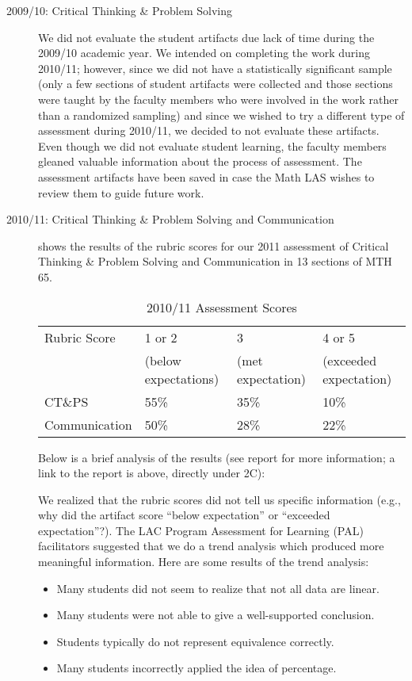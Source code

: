 \begin{description}
\item[2009/10: Critical Thinking \& Problem Solving]
We did not evaluate the student artifacts due lack of time during the 2009/10 academic year. We intended on completing the work during 2010/11; however, since we did not have a statistically significant sample (only a few sections of student artifacts were collected and those sections were taught by the faculty members who were involved in the work rather than a randomized sampling) and since we wished to try a different type of assessment during 2010/11, we decided to not evaluate these artifacts.  Even though we did not evaluate student learning, the faculty members gleaned valuable information about the process of assessment. The assessment artifacts have been saved in case the Math LAS wishes to review them to guide future work.
\item[2010/11:  Critical Thinking \& Problem Solving and Communication]
 shows the results of the rubric scores for our 2011 assessment of Critical Thinking \& Problem Solving and Communication in 13 sections of MTH 65.
\begin{table}[!htb]
\centering
\caption{2010/11 Assessment Scores}\label{ass:tab:201011scores}
\begin{tabular}{llll}
\toprule
Rubric Score & 1 or 2 & 3 & 4 or 5\\
&(below expectations)&(met expectation)&(exceeded expectation)\\
\midrule
CT\&PS &55\%&35\%&10\%\\
Communication &50\%&28\%&22\%\\
\bottomrule
\end{tabular}
\end{table}

Below is a brief analysis of the results (see report for more information; a link to the report is above, directly under 2C):

We realized that the rubric scores did not tell us specific information (e.g., why did the artifact score ``below expectation'' or ``exceeded expectation''?).  The LAC Program Assessment for Learning (PAL) facilitators suggested that we do a trend analysis which produced more meaningful information. Here are some results of the trend analysis:
\begin{itemize}
\item Many students did not seem to realize that not all data are linear.
\item Many students were not able to give a well-supported conclusion.
\item Students typically do not represent equivalence correctly.
\item Many students incorrectly applied the idea of percentage.
\end{itemize}


\end{description}
